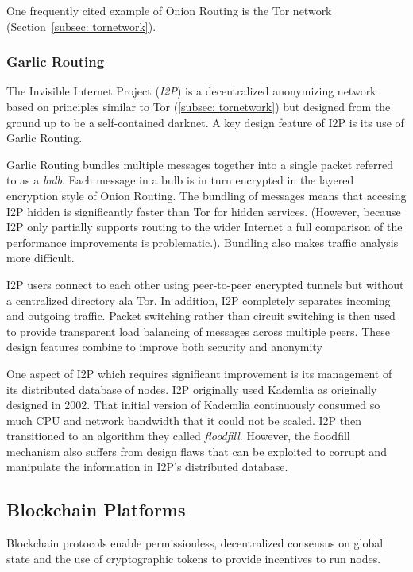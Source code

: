 One frequently cited example of Onion Routing is the Tor network (Section~\ref{subsec: tornetwork}). 

\subsubsection{Garlic Routing}
\label{subsec-garlicrouting}
The Invisible Internet Project (\textit{I2P}) is a decentralized anonymizing network based on principles similar to Tor (\ref{subsec: tornetwork}) but designed from the ground up to be a self-contained darknet. A key design feature of I2P is its use of Garlic Routing\cite{26}.


Garlic Routing bundles multiple messages together into a single packet referred to as a \textit{bulb}. Each message in a bulb is in turn encrypted in the layered encryption style of Onion Routing. The bundling of messages means that accesing I2P hidden is significantly faster than Tor for hidden services. (However, because I2P only partially supports routing to the wider Internet a full comparison of the performance improvements is problematic.). Bundling also makes traffic analysis more difficult.

I2P users connect to each other using peer-to-peer encrypted tunnels but without a centralized directory ala Tor. In addition, I2P completely separates incoming and outgoing traffic. Packet switching rather than circuit switching is then used to provide transparent load balancing of messages across multiple peers. These design features combine to improve both security and anonymity

One aspect of I2P which requires significant improvement is its management of its distributed database of nodes. I2P originally used Kademlia as originally designed in 2002\cite{27}. That initial version of Kademlia continuously consumed so much CPU and network bandwidth that it could not be scaled. I2P then transitioned to an algorithm they called \textit{floodfill}. However, the floodfill mechanism also suffers from design flaws that can be exploited to corrupt and manipulate the information in I2P's distributed database\cite{28}.


\subsection{Blockchain Platforms}
Blockchain protocols enable permissionless, decentralized consensus on global state and the use of cryptographic tokens to provide incentives to run nodes. 

